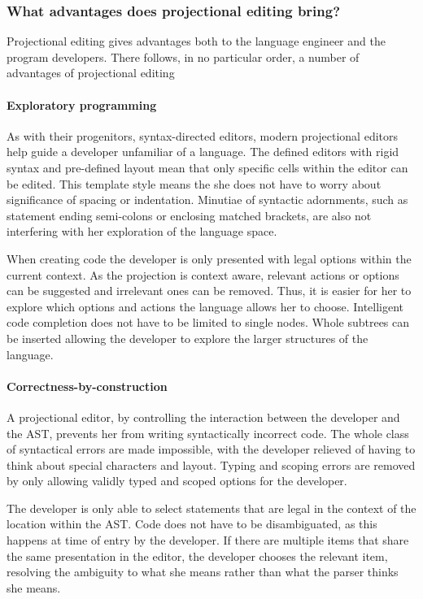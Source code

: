 \subsubsection{What advantages does projectional editing bring?}

Projectional editing gives advantages both to the language engineer and the program developers.
There follows, in no particular order, a number of advantages of projectional editing 
 
\paragraph{Exploratory programming}
As with their progenitors, syntax-directed editors, modern projectional editors help guide a developer unfamiliar of a language.
The defined editors with rigid syntax and pre-defined layout mean that only specific cells within the editor can be edited.
This template style means the she does not have to worry about significance of spacing or indentation.
Minutiae of syntactic adornments, such as statement ending semi-colons or enclosing matched brackets, are also not interfering with her exploration of the language space.

When creating code the developer is only presented with legal options within the current context.
As the projection is context aware, relevant actions or options can be suggested and irrelevant ones can be removed.
Thus, it is easier for her to explore which options and actions the language allows her to choose.
Intelligent code completion does not have to be limited to single nodes. 
Whole subtrees can be inserted allowing the developer to explore the larger structures of the language.

\paragraph{Correctness-by-construction}
A projectional editor, by controlling the interaction between the developer and the AST, prevents her from writing syntactically incorrect code.
The whole class of syntactical errors are made impossible, with the developer relieved of having to think about special characters and layout.
Typing and scoping errors are removed by only allowing validly typed and scoped options for the developer.

The developer is only able to select statements that are legal in the context of the location within the AST.
Code does not have to be disambiguated, as this happens at time of entry by the developer.
If there are multiple items that share the same presentation in the editor, the developer chooses the relevant item, resolving the ambiguity to what she means rather than what the parser thinks she means.


